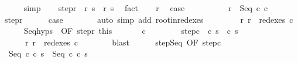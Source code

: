 \begin{isabellebody}
\ \ \ \ \isamarkupfalse%
\ simp\isanewline
\ \ \isamarkupfalse%
\ step{\isacharunderscore}r{\isacharcolon}\ {\isachardoublequoteopen}{\isasymGamma}{\isasymturnstile}\ {\isacharparenleft}r{\isacharcomma}\ s{\isacharparenright}\ {\isasymrightarrow}\ {\isacharparenleft}r{\isacharprime}{\isacharcomma}\ s{\isacharprime}{\isacharparenright}{\isachardoublequoteclose}\ \isamarkupfalse%
\ fact\isanewline
\ \ \isamarkupfalse%
\ r\ \isamarkupfalse%
\ {\isacharquery}case\isanewline
\ \ \isamarkupfalse%
\ \isanewline
\ \ \ \ \isamarkupfalse%
\ {\isachardoublequoteopen}r\ {\isacharequal}\ Seq\ c\ c\isanewline
\ \ \ \ \isamarkupfalse%
\ step{\isacharunderscore}r\isanewline
\ \ \ \ \isamarkupfalse%
\ {\isacharquery}case\isanewline
\ \ \ \ \ \ \isamarkupfalse%
\ {\isacharparenleft}auto\ simp\ add{\isacharcolon}\ root{\isacharunderscore}in{\isacharunderscore}redexes{\isacharparenright}\isanewline
\ \ \isamarkupfalse%
\isanewline
\ \ \ \ \isamarkupfalse%
\ r{\isacharcolon}\ {\isachardoublequoteopen}r\ {\isasymin}\ redexes\ c\isanewline
\ \ \ \ \isamarkupfalse%
\ Seq{\isachardot}hyps\ {\isacharparenleft}{}{\isacharparenright}\ {\isacharbrackleft}OF\ step{\isacharunderscore}r\ this{\isacharbrackright}\ \isanewline
\ \ \ \ \isamarkupfalse%
\ c{\isacharprime}\ \ \isanewline
\ \ \ \ \ \ step{\isacharunderscore}c\ {\isachardoublequoteopen}{\isasymGamma}{\isasymturnstile}\ {\isacharparenleft}c\ s{\isacharparenright}\ {\isasymrightarrow}\ {\isacharparenleft}c{\isacharprime}{\isacharcomma}\ s{\isacharprime}{\isacharparenright}{\isachardoublequoteclose}\ \isanewline
\ \ \ \ \ \ r{\isacharprime}{\isacharcolon}\ {\isachardoublequoteopen}r{\isacharprime}\ {\isasymin}\ redexes\ c{\isacharprime}{\isachardoublequoteclose}\isanewline
\ \ \ \ \ \ \isamarkupfalse%
\ blast\isanewline
\ \ \ \ \isamarkupfalse%
\ step{\isachardot}Seq\ {\isacharbrackleft}OF\ step{\isacharunderscore}c\isanewline
\ \ \ \ \isamarkupfalse%
\ {\isachardoublequoteopen}{\isasymGamma}{\isasymturnstile}\ {\isacharparenleft}Seq\ c\ c\ s{\isacharparenright}\ {\isasymrightarrow}\ {\isacharparenleft}Seq\ c{\isacharprime}\ c\ s{\isacharprime}{\isacharparenright}{\isachardoublequoteclose}\isacommand{{\isachardot}}\isamarkupfalse%

\end{isabellebody}
